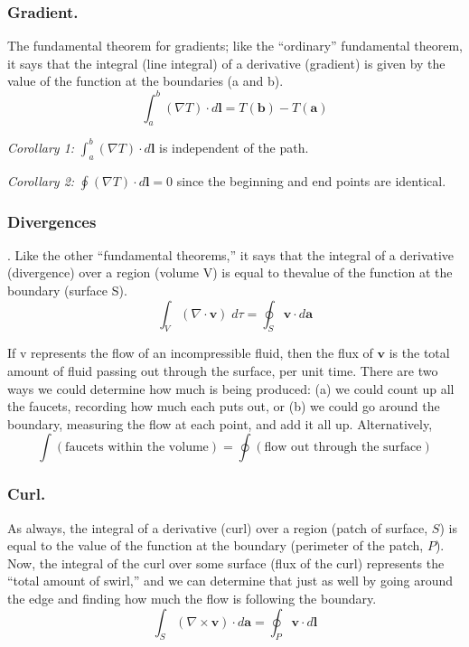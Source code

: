 \documentclass[../main.tex]{subfiles}
\begin{document}
\subsubsection*{Gradient.} The fundamental theorem for gradients; like the “ordinary” fundamental theorem, it says that the integral (line integral) of a derivative (gradient) is given by the value of the function at the boundaries (a and b).
\begin{equation*}
    \int_{a}^{b}(\nabla T)\cdot d\mathbf{l}=T(\mathbf{b})-T(\mathbf{a})
\end{equation*}

\emph{Corollary 1:} $ \int_{a}^{b}(\nabla T)\cdot d\mathbf{l}$ is independent of the path.

\emph{Corollary 2:} $\oint (\nabla T)\cdot d\mathbf{l}=0 $ since the beginning and end points are identical.

\subsubsection*{Divergences}.
Like the other “fundamental theorems,” it says that the integral of a derivative (divergence) over a region (volume V) is equal to thevalue of the function at the boundary (surface S).
\begin{equation*}
    \int_{V}(\nabla \cdot \mathbf{v})\;d\tau=\oint_{S}\mathbf{v}\cdot d\mathbf{a}
\end{equation*}

If v represents the flow of an incompressible fluid, then the flux of $\mathbf{v}$ is the total amount of fluid passing out through the surface, per unit time.  There are two ways we could determine how much is being produced: (a) we could count up all the faucets, recording how much each puts out, or (b) we could go around the boundary, measuring the ﬂow at each point, and add it all up. Alternatively,
\begin{equation*}
    \int (\text{faucets within the volume})=\oint (\text{ﬂow out through the surface})
\end{equation*}

\subsubsection*{Curl.} As always, the integral of a derivative (curl) over a region (patch of surface, $S$) is equal to the value of the function at the boundary (perimeter of the patch, $P$). Now, the integral of the curl over some surface (flux of the curl) represents the “total amount of swirl,” and we can determine that just as well by going around the edge and finding how much the flow is following the boundary.
\begin{equation*}
    \int_{S}(\nabla \times \mathbf{v})\cdot d\mathbf{a}=\oint_{P}\mathbf{v}\cdot d\mathbf{l}
\end{equation*}
\end{document}
